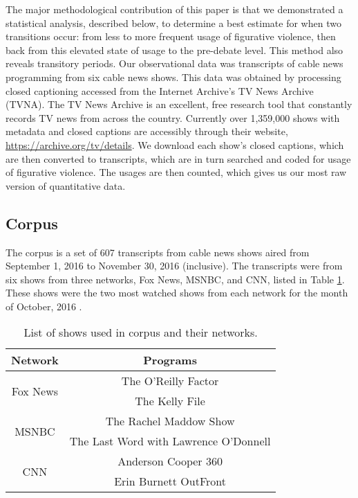 The major methodological contribution of this paper is that we demonstrated
a statistical analysis, described below, to determine a best estimate
for when two transitions occur: from less to more frequent usage of 
figurative violence, then back from this elevated state of usage to the pre-debate
level. This method also reveals transitory periods.
Our observational data was transcripts of cable news programming from six
cable news shows. This data was obtained by processing closed captioning
accessed from the Internet Archive's TV News Archive (TVNA). The TV News Archive
is an excellent, free research tool that constantly 
records TV news from across the country. Currently over 1,359,000 shows with
metadata and closed captions are accessibly through their website, 
\url{https://archive.org/tv/details}. We download each show's closed captions,
which are then converted to transcripts, 
which are in turn searched and coded for usage of
figurative violence. The usages are then counted, which gives us our most raw
version of quantitative data.

\subsection{Corpus}
\label{subsec:Corpus}

The corpus is a set of 607 transcripts from cable news shows aired from
September 1, 2016 to November 30, 2016 (inclusive). The transcripts were from
six shows from three networks, Fox News, MSNBC, and CNN, listed in  
Table \ref{tab:shows}. These shows were the two most watched shows from 
each network for the month of October, 2016 \cite{Katz2016}.  

\vspace{.2in}

\begin{table}[!htb]
  \centering
    \begin{tabular}{|c|c|}
      \hline
        Network & Programs \\
      \hline
      \multirow{2}{*}{Fox News} 
        & The O'Reilly Factor \\
        & The Kelly File \\
      \hline
      \multirow{2}{*}{MSNBC}
        & The Rachel Maddow Show \\
        & The Last Word with Lawrence O'Donnell \\
      \hline
      \multirow{2}{*}{CNN}
        & Anderson Cooper 360 \\
        & Erin Burnett OutFront \\
      \hline
    \end{tabular}
  \caption{List of shows used in corpus and their networks.}
  \label{tab:shows}
\end{table}


